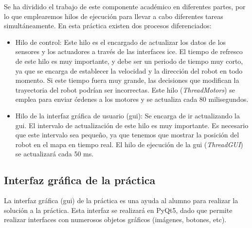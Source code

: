 Se ha dividido el trabajo de este componente académico en diferentes partes, por lo que emplearemos hilos de ejecución para llevar a cabo diferentes tareas simultáneamente. En esta práctica existen dos procesos diferenciados:

\begin{itemize}
\item Hilo de control: Este hilo es el encargado de actualizar los datos de los sensores y los actuadores a través de las interfaces \acrshort{ice}. El tiempo de refresco de este hilo es muy importante, y debe ser un periodo de tiempo muy corto, ya que se encarga de establecer la velocidad y la dirección del robot en todo momento. Si este tiempo fuera muy grande, las decisiones que modifican la trayectoria del robot podrían ser incorrectas. Este hilo (\textit{ThreadMotors}) se emplea para enviar órdenes a los motores y se actualiza cada 80 milisegundos.

\item	Hilo de la interfaz gráfica de usuario (\acrshort{gui}): Se encarga de ir actualizando la \acrshort{gui}. El intervalo de actualización de este hilo es muy importante. Es necesario que este intervalo sea pequeño, ya que tenemos que mostrar la posición del robot en el mapa en tiempo real. El hilo de ejecución de la \acrshort{gui} (\textit{ThreadGUI}) se actualizará cada 50 ms.

\end{itemize}

\subsection{Interfaz gráfica de la práctica}

La interfaz gráfica (\acrshort{gui}) de la práctica es una ayuda al alumno para realizar la solución a la práctica. Esta interfaz se realizará en PyQt5, dado que permite realizar interfaces con numerosos objetos gráficos (imágenes, botones, etc).\\


